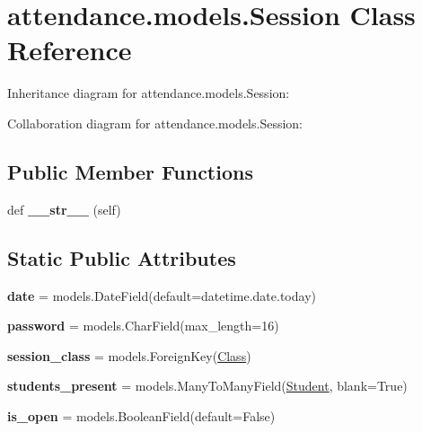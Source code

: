 \hypertarget{classattendance_1_1models_1_1_session}{}\section{attendance.\+models.\+Session Class Reference}
\label{classattendance_1_1models_1_1_session}


Inheritance diagram for attendance.\+models.\+Session\+:


Collaboration diagram for attendance.\+models.\+Session\+:
\subsection*{Public Member Functions}
\begin{DoxyCompactItemize}
\item 
\hypertarget{classattendance_1_1models_1_1_session_afb9de23532d9bc5d318eae47c2a986e1}{}\label{classattendance_1_1models_1_1_session_afb9de23532d9bc5d318eae47c2a986e1} 
def {\bfseries \+\_\+\+\_\+str\+\_\+\+\_\+} (self)
\end{DoxyCompactItemize}
\subsection*{Static Public Attributes}
\begin{DoxyCompactItemize}
\item 
\hypertarget{classattendance_1_1models_1_1_session_a9421040baed01574deb73ef0ef2ba270}{}\label{classattendance_1_1models_1_1_session_a9421040baed01574deb73ef0ef2ba270} 
{\bfseries date} = models.\+Date\+Field(default=datetime.\+date.\+today)
\item 
\hypertarget{classattendance_1_1models_1_1_session_a1b85f22f1587ac442465b22ba52cc253}{}\label{classattendance_1_1models_1_1_session_a1b85f22f1587ac442465b22ba52cc253} 
{\bfseries password} = models.\+Char\+Field(max\+\_\+length=16)
\item 
\hypertarget{classattendance_1_1models_1_1_session_a3e17a2676761ea56d62b88ec72c82fa8}{}\label{classattendance_1_1models_1_1_session_a3e17a2676761ea56d62b88ec72c82fa8} 
{\bfseries session\+\_\+class} = models.\+Foreign\+Key(\hyperlink{classattendance_1_1models_1_1_class}{Class})
\item 
\hypertarget{classattendance_1_1models_1_1_session_ac1302382f5a68c564ebe70a2f72bb335}{}\label{classattendance_1_1models_1_1_session_ac1302382f5a68c564ebe70a2f72bb335} 
{\bfseries students\+\_\+present} = models.\+Many\+To\+Many\+Field(\hyperlink{classattendance_1_1models_1_1_student}{Student}, blank=True)
\item 
\hypertarget{classattendance_1_1models_1_1_session_a54ba950822e1d36ce5948036914f0260}{}\label{classattendance_1_1models_1_1_session_a54ba950822e1d36ce5948036914f0260} 
{\bfseries is\+\_\+open} = models.\+Boolean\+Field(default=False)
\end{DoxyCompactItemize}


